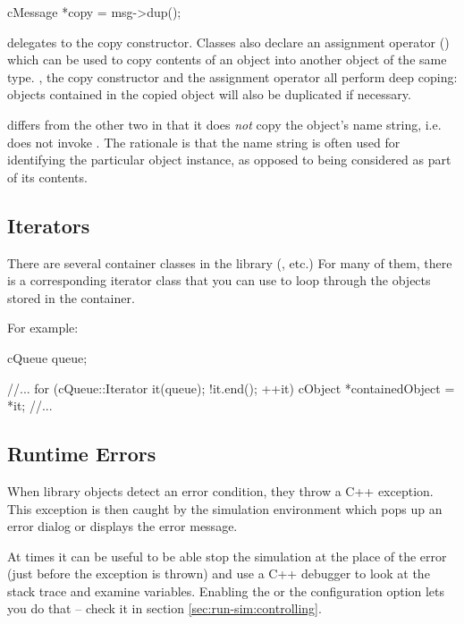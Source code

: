 \begin{cpp}
cMessage *copy = msg->dup();
\end{cpp}

 delegates to the copy constructor. Classes also declare
an assignment operator () which can be used to copy contents
of an object into another object of the same type. , the copy
constructor and the assignment operator all perform deep coping: objects
contained in the copied object will also be duplicated if necessary.

 differs from the other two in that it does \textit{not}
copy the object's name string, i.e. does not invoke .
The rationale is that the name string is often used for identifying the particular
object instance, as opposed to being considered as part of its contents.


\subsection{Iterators}
\label{sec:sim-lib:iterators}

There are several container classes in the library (,
 etc.) For many of them, there is a corresponding
iterator class that you can use to loop through the objects stored in
the container.

For example:

\begin{cpp}
cQueue queue;

//...
for (cQueue::Iterator it(queue); !it.end(); ++it) {
    cObject *containedObject = *it;
    //...
}
\end{cpp}

\subsection{Runtime Errors}
\label{sec:sim-lib:runtime-errors}

When library objects detect an error condition, they throw a C++ exception.
This exception is then caught by the simulation environment which pops up
an error dialog or displays the error message.

At times it can be useful to be able stop the simulation at the place of
the error (just before the exception is thrown) and use a C++ debugger to
look at the stack trace and examine variables. Enabling the
 or the 
configuration option lets you do that -- check it in section
\ref{sec:run-sim:controlling}.


